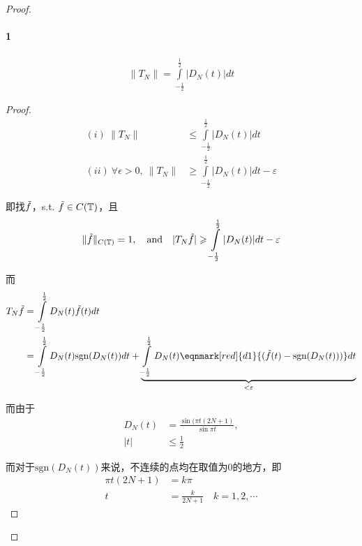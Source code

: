 \begin{proof}
    \paragraph{1} 
    \begin{align*}
        \|T_N\| = \int\limits_{-\frac{1}{2}}^{\frac{1}{2}} |D_N(t)|dt
    \end{align*}
    \begin{proof}
        \begin{align*}
            (i)\ \|T_N\| &\leqslant \int\limits_{-\frac{1}{2}}^{\frac{1}{2}} |D_N(t)|dt \\
            (ii)\ \forall \epsilon > 0,\ \|T_N\| & \geqslant \int\limits_{-\frac{1}{2}}^{\frac{1}{2}} |D_N(t)|dt - \varepsilon
        \end{align*}

        即找$\Tilde{f}$，s.t. $\Tilde{f}\in C(\mathbb{T})$，且
        \begin{align*}
            \|\Tilde{f}\|_{C(\mathbb{T})} = 1,\quad \text{and} \quad |T_N \Tilde{f}| \geqslant \int\limits_{-\frac{1}{2}}^{\frac{1}{2}} |D_N(t)|dt - \varepsilon
        \end{align*}

        而
        \begin{align*}
            T_N \Tilde{f} &= \int\limits_{-\frac{1}{2}}^{\frac{1}{2}} D_N(t) \Tilde{f}(t) dt \\
            &= \int\limits_{-\frac{1}{2}}^{\frac{1}{2}} D_N(t) \text{sgn}(D_N(t)) dt + \underbrace{\int\limits_{-\frac{1}{2}}^{\frac{1}{2}} D_N(t) \eqnmark[red]{d1}{(\Tilde{f}(t) - \text{sgn}(D_N(t)))} dt}\limits_{<\varepsilon}
        \end{align*}

        而由于
        \begin{align*}
            D_N(t) &= \frac{\sin(\pi t(2N+1)}{\sin \pi t}, \\
            |t| &\leqslant \frac{1}{2}
        \end{align*}

        而对于$\text{sgn}(D_N(t))$来说，不连续的点均在取值为$0$的地方，即
        \begin{align*}
            \pi t (2N+1) &= k\pi \\
            t & = \frac{k}{2N+1} \quad k = 1,2,\cdots
        \end{align*}
    \end{proof}


\end{proof}
